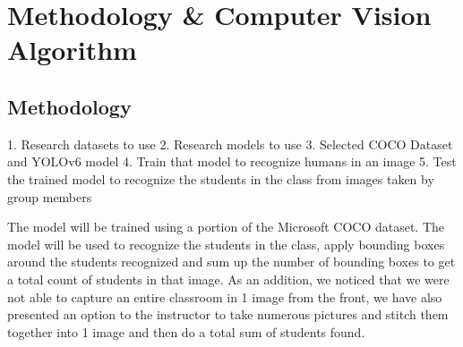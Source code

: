 \section{Methodology \& Computer Vision Algorithm}
\label{sec:method}
\subsection{Methodology}
\label{subsec:method}
1. Research datasets to use \cite{YOLOpaper2}
2. Research models to use 
3. Selected COCO Dataset and YOLOv6 \cite{YOLOpaper1} model
4. Train that model to recognize humans in an image \cite{YOLO}
5. Test the trained model to recognize the students in the class from images taken by group members

The model will be trained using a portion of the Microsoft COCO dataset. The model will be used to recognize the students in the class, apply bounding boxes around the students recognized and sum up the number of bounding boxes to get a total count of students in that image. As an addition, we noticed that we were not able to capture an entire classroom in 1 image from the front, we have also presented an option to the instructor to take numerous pictures and stitch them together into 1 image and then do a total sum of students found.\\ 


